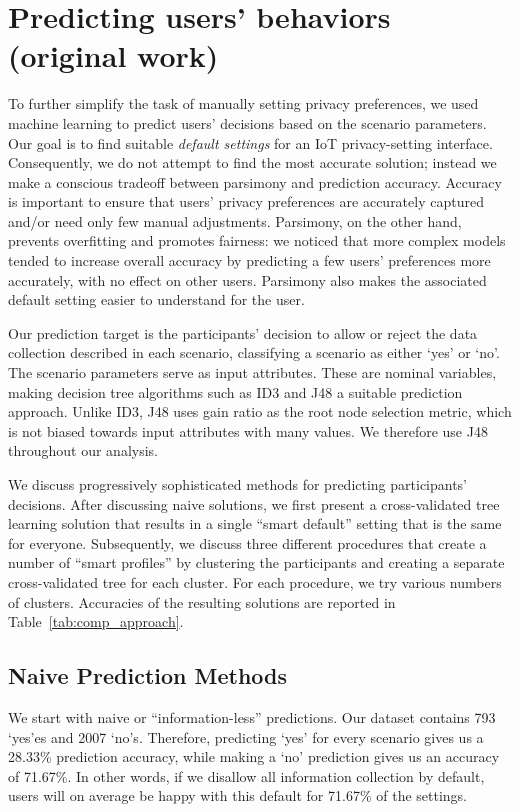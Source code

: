 \section{Predicting users' behaviors (original work)}\label{sec:predict1}
To further simplify the task of manually setting privacy preferences, we used machine learning to predict users' decisions based on the scenario parameters. Our goal is to find suitable \emph{default settings} for an IoT privacy-setting interface. Consequently, we do not attempt to find the most accurate solution; instead we make a conscious tradeoff between parsimony and prediction accuracy. Accuracy is important to ensure that users' privacy preferences are accurately captured and/or need only few manual adjustments. Parsimony, on the other hand, prevents overfitting and promotes fairness: we noticed that more complex models tended to increase overall accuracy by predicting a few users' preferences more accurately, with no effect on other users. Parsimony also makes the associated default setting easier to understand for the user. 

Our prediction target is the participants' decision to allow or reject the data collection described in each scenario, classifying a scenario as either `yes' or `no'. The scenario parameters serve as input attributes. These are nominal variables, making decision tree algorithms such as ID3 and J48 a suitable prediction approach. Unlike ID3, J48 uses gain ratio as the root node selection metric, which is not biased towards input attributes with many values. We therefore use J48 throughout our analysis.

We discuss progressively sophisticated methods for predicting participants' decisions. After discussing naive solutions, we first present a cross-validated tree learning solution that results in a single ``smart default'' setting that is the same for everyone. Subsequently, we discuss three different procedures that create a number of ``smart profiles'' by clustering the participants and creating a separate cross-validated tree for each cluster. For each procedure, we try various numbers of clusters. Accuracies of the resulting solutions are reported in Table~\ref{tab:comp_approach}.

\subsection{Naive Prediction Methods}
We start with naive or ``information-less'' predictions. Our dataset contains 793 `yes'es and 2007 `no's. Therefore, predicting `yes' for every scenario gives us a 28.33\% prediction accuracy, while making a `no' prediction gives us an accuracy of 71.67\%. In other words, if we disallow all information collection by default, users will on average be happy with this default for 71.67\% of the settings.

